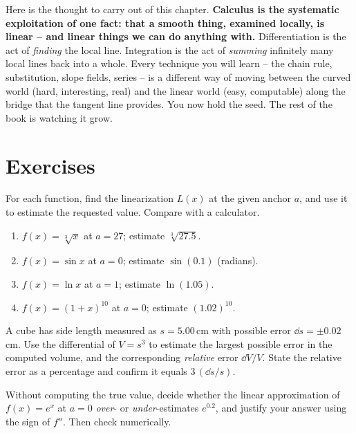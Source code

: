 \begin{aestheticbox}
Here is the thought to carry out of this chapter. \textbf{Calculus is the
systematic exploitation of one fact: that a smooth thing, examined locally, is
linear -- and linear things we can do anything with.} Differentiation is the act
of \emph{finding} the local line. Integration is the act of \emph{summing}
infinitely many local lines back into a whole. Every technique you will learn --
the chain rule, substitution, slope fields, series -- is a different way of
moving between the curved world (hard, interesting, real) and the linear world
(easy, computable) along the bridge that the tangent line provides. You now hold
the seed. The rest of the book is watching it grow.
\end{aestheticbox}

\section{Exercises}
\label{ch14:exercises}

\begin{exercise}
For each function, find the linearization $L(x)$ at the given anchor $a$, and use
it to estimate the requested value. Compare with a calculator.
\begin{enumerate}
\item $f(x)=\sqrt[3]{x}$ at $a=27$; estimate $\sqrt[3]{27.5}$.
\item $f(x)=\sin x$ at $a=0$; estimate $\sin(0.1)$ (radians).
\item $f(x)=\ln x$ at $a=1$; estimate $\ln(1.05)$.
\item $f(x)=(1+x)^{10}$ at $a=0$; estimate $(1.02)^{10}$.
\end{enumerate}
\end{exercise}

\begin{exercise}
A cube has side length measured as $s = 5.00\,$cm with possible error $\dd s =
\pm 0.02\,$cm. Use the differential of $V=s^3$ to estimate the largest possible
error in the computed volume, and the corresponding \emph{relative} error
$\dd V/V$. State the relative error as a percentage and confirm it equals
$3\,(\dd s/s)$.
\end{exercise}

\begin{exercise}
Without computing the true value, decide whether the linear approximation of
$f(x)=e^x$ at $a=0$ \emph{over}- or \emph{under}-estimates $e^{0.2}$, and justify
your answer using the sign of $f''$. Then check numerically.
\end{exercise}

